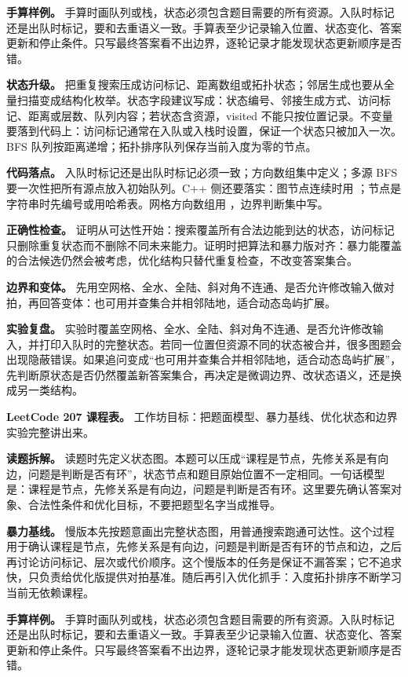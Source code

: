\textbf{手算样例。} 手算时画队列或栈，状态必须包含题目需要的所有资源。入队时标记还是出队时标记，要和去重语义一致。手算表至少记录输入位置、状态变化、答案更新和停止条件。只写最终答案看不出边界，逐轮记录才能发现状态更新顺序是否错。

\textbf{状态升级。} 把重复搜索压成访问标记、距离数组或拓扑状态；邻居生成也要从全量扫描变成结构化枚举。状态字段建议写成：状态编号、邻接生成方式、访问标记、距离或层数、队列内容；若状态含资源，visited 不能只按位置记录。不变量要落到代码上：访问标记通常在入队或入栈时设置，保证一个状态只被加入一次。BFS 队列按距离递增；拓扑排序队列保存当前入度为零的节点。

\textbf{代码落点。} 入队时标记还是出队时标记必须一致；方向数组集中定义；多源 BFS 要一次性把所有源点放入初始队列。C++ 侧还要落实：图节点连续时用 ；节点是字符串时先编号或用哈希表。网格方向数组用 ，边界判断集中写。

\textbf{正确性检查。} 证明从可达性开始：搜索覆盖所有合法边能到达的状态，访问标记只删除重复状态而不删除不同未来能力。证明时把算法和暴力版对齐：暴力能覆盖的合法候选仍然会被考虑，优化结构只替代重复检查，不改变答案集合。

\textbf{边界和变体。} 先用空网格、全水、全陆、斜对角不连通、是否允许修改输入做对拍，再回答变体：也可用并查集合并相邻陆地，适合动态岛屿扩展。

\textbf{实验复盘。} 实验时覆盖空网格、全水、全陆、斜对角不连通、是否允许修改输入，并打印入队时的完整状态。若同一位置但资源不同的状态被合并，很多图题会出现隐蔽错误。如果追问变成“也可用并查集合并相邻陆地，适合动态岛屿扩展”，先判断原状态是否仍然覆盖新答案集合，再决定是微调边界、改状态语义，还是换成另一类结构。

\noindent\textbf{LeetCode 207 课程表。} 工作坊目标：把题面模型、暴力基线、优化状态和边界实验完整讲出来。

\textbf{读题拆解。} 读题时先定义状态图。本题可以压成“课程是节点，先修关系是有向边，问题是判断是否有环”，状态节点和题目原始位置不一定相同。一句话模型是：课程是节点，先修关系是有向边，问题是判断是否有环。这里要先确认答案对象、合法性条件和优化目标，不要把题型名字当成推导。

\textbf{暴力基线。} 慢版本先按题意画出完整状态图，用普通搜索跑通可达性。这个过程用于确认课程是节点，先修关系是有向边，问题是判断是否有环的节点和边，之后再讨论访问标记、层次或代价顺序。这个慢版本的任务是保证不漏答案；它不追求快，只负责给优化版提供对拍基准。随后再引入优化抓手：入度拓扑排序不断学习当前无依赖课程。

\textbf{手算样例。} 手算时画队列或栈，状态必须包含题目需要的所有资源。入队时标记还是出队时标记，要和去重语义一致。手算表至少记录输入位置、状态变化、答案更新和停止条件。只写最终答案看不出边界，逐轮记录才能发现状态更新顺序是否错。

